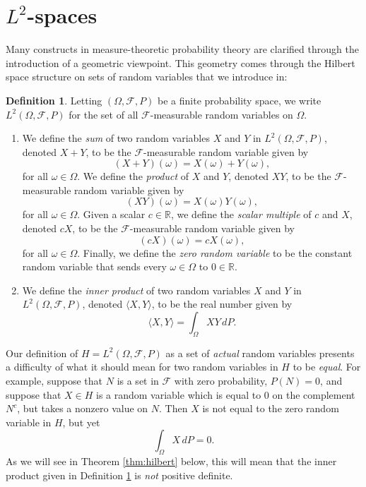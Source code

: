 \documentclass[11pt]{book}
\theoremstyle{definition}
\newtheorem{defn}[thm]{Definition}
\numberwithin{equation}{section}
\begin{document}
\section{\texorpdfstring{$L^2$-spaces}{L2-spaces}}

Many constructs in measure-theoretic probability theory are clarified through the introduction of a geometric viewpoint. This geometry comes through the Hilbert space structure on sets of random variables that we introduce in:

\begin{defn}\label{defn:l2}
	Letting $(\Omega, \mathcal{F}, P)$ be a finite probability space, we write $L^2(\Omega, \mathcal{F}, P)$ for the set of all $\mathcal{F}$-measurable random variables on $\Omega$.
	\begin{enumerate}
		\item We define the \textit{sum} of two random variables $X$ and $Y$ in $L^2(\Omega, \mathcal{F}, P)$, denoted $X+Y$, to be the $\mathcal{F}$-measurable random variable given by
		      \[
			      (X+Y)(\omega) = X(\omega) + Y(\omega),
		      \]
		      for all $\omega \in \Omega$. We define the \textit{product} of $X$ and $Y$, denoted $XY$, to be the $\mathcal{F}$-measurable random variable given by
		      \[
			      (XY)(\omega) = X(\omega) Y(\omega),
		      \]
		      for all $\omega\in \Omega$. Given a scalar $c\in \mathbb{R}$, we define the \textit{scalar multiple} of $c$ and $X$, denoted $cX$, to be the $\mathcal{F}$-measurable random variable given by
		      \[
			      (cX)(\omega) = c X(\omega),
		      \]
		      for all $\omega \in \Omega$. Finally, we define the \textit{zero random variable} to be the constant random variable that sends every $\omega\in \Omega$ to $0\in \mathbb{R}$.
		\item We define the \textit{inner product} of two random variables $X$ and $Y$ in $L^2(\Omega, \mathcal{F}, P)$, denoted $\langle X, Y \rangle$, to be the real number given by
		      \[
			      \langle X, Y\rangle = \int_\Omega XY \, dP.
		      \]
	\end{enumerate}
\end{defn}

Our definition of $H = L^2(\Omega, \mathcal{F}, P)$ as a set of \textit{actual} random variables presents a difficulty of what it should mean for two random variables in $H$ to be \textit{equal}. For example, suppose that $N$ is a set in $\mathcal{F}$ with zero probability, $P(N)=0$, and suppose that $X\in H$ is a random variable which is equal to $0$ on the complement $N^c$, but takes a nonzero value on $N$. Then $X$ is not equal to the zero random variable in $H$, but yet
\[
	\int_\Omega X \, dP=0.
\]
As we will see in Theorem \ref{thm:hilbert} below, this will mean that the inner product given in Definition \ref{defn:l2} is \textit{not} positive definite.
\end{document}
